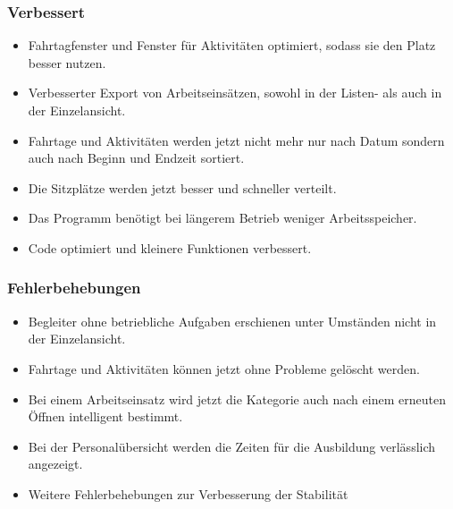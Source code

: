 \subsubsection{Verbessert}
\begin{itemize}
  \item
  Fahrtagfenster und Fenster für Aktivitäten optimiert, sodass sie den Platz besser nutzen.
  \item
  Verbesserter Export von Arbeitseinsätzen, sowohl in der Listen- als auch in der Einzelansicht.
  \item
  Fahrtage und Aktivitäten werden jetzt nicht mehr nur nach Datum sondern auch nach Beginn und Endzeit sortiert.
  \item
  Die Sitzplätze werden jetzt besser und schneller verteilt.
  \item
  Das Programm benötigt bei längerem Betrieb weniger Arbeitsspeicher.
  \item
  Code optimiert und kleinere Funktionen verbessert.
\end{itemize}

\subsubsection{Fehlerbehebungen}
\begin{itemize}
  \item
  Begleiter ohne betriebliche Aufgaben erschienen unter Umständen nicht in der Einzelansicht.
  \item
  Fahrtage und Aktivitäten können jetzt ohne Probleme gelöscht werden.
  \item
  Bei einem Arbeitseinsatz wird jetzt die Kategorie auch nach einem erneuten Öffnen intelligent bestimmt.
  \item
  Bei der Personalübersicht werden die Zeiten für die Ausbildung verlässlich angezeigt.
  \item
  Weitere Fehlerbehebungen zur Verbesserung der Stabilität
\end{itemize}
